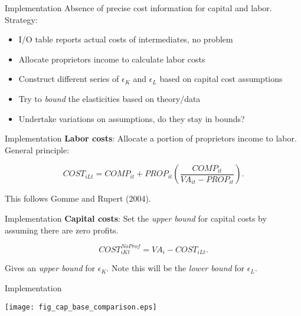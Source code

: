 \documentclass[10pt, xcolor=dvipsnames]{beamer}
\begin{document}
\begin{frame}{Implementation}
Absence of precise cost information for capital and labor. Strategy:

\begin{itemize}
  \item I/O table reports actual costs of intermediates, no problem
  \item Allocate proprietors income to calculate labor costs
  \item Construct different series of $\epsilon_K$ and $\epsilon_L$ based on capital cost assumptions
  \item Try to \textit{bound} the elasticities based on theory/data
  \item Undertake variations on assumptions, do they stay in bounds?
\end{itemize}

\end{frame}

\begin{frame}{Implementation}
\textbf{Labor costs}: Allocate a portion of proprietors income to labor. General principle:

\begin{equation}
  COST_{iLt} = COMP_{it} + PROP_{it}\left(\frac{COMP_{it}}{VA_{it}-PROP_{it}}\right).
\end{equation}

This follows Gomme and Rupert (2004).

\end{frame}

\begin{frame}{Implementation}
\textbf{Capital costs}: Set the \textit{upper bound} for capital costs by assuming there are zero profits.

\begin{equation}
  COST_{iKt}^{NoProf} = VA_i - COST_{iLt}.
\end{equation}

Gives an \textit{upper bound} for $\epsilon_K$. Note this will be the \textit{lower bound} for $\epsilon_L$.

\end{frame}

\begin{frame}{Implementation}
\begin{center}
\texttt{[image: fig\_cap\_base\_comparison.eps]}
\end{center}
\end{frame}
\end{document}
